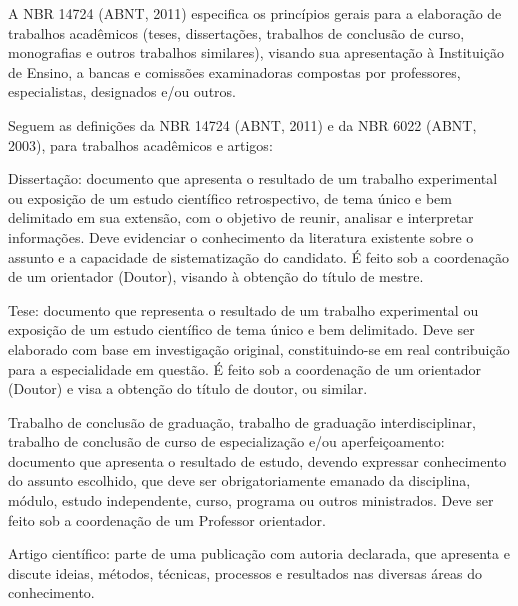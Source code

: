 \begin{Desenvolvimento} %

A NBR 14724 (ABNT, 2011) especifica os princípios gerais para a elaboração de trabalhos acadêmicos (teses, dissertações, trabalhos de conclusão de curso, monografias e outros trabalhos similares), visando sua apresentação à Instituição de Ensino, a bancas e comissões examinadoras compostas por professores, especialistas, designados e/ou outros.

Seguem as definições da NBR 14724 (ABNT, 2011) e da NBR 6022 (ABNT, 2003), para trabalhos acadêmicos e artigos:

\begin{alinea}
    \item Dissertação: documento que apresenta o resultado de um trabalho experimental ou exposição de um estudo científico retrospectivo, de tema único e bem delimitado em sua extensão, com o objetivo de reunir, analisar e interpretar informações. Deve evidenciar o conhecimento da literatura existente sobre o assunto e a capacidade de sistematização do candidato. É feito sob a coordenação de um orientador (Doutor), visando à obtenção do título de mestre.
    \item Tese: documento que representa o resultado de um trabalho experimental ou exposição de um estudo científico de tema único e bem delimitado. Deve ser elaborado com base em investigação original, constituindo-se em real contribuição para a especialidade em questão. É feito sob a coordenação de um orientador (Doutor) e visa a obtenção do título de doutor, ou similar.
    \item Trabalho de conclusão de graduação, trabalho de graduação interdisciplinar, trabalho de conclusão de curso de especialização e/ou aperfeiçoamento: documento que apresenta o resultado de estudo, devendo expressar conhecimento do assunto escolhido, que deve ser obrigatoriamente emanado da disciplina, módulo, estudo independente, curso, programa ou outros ministrados. Deve ser feito sob a coordenação de um Professor orientador.
    \item Artigo científico: parte de uma publicação com autoria declarada, que apresenta e discute ideias, métodos, técnicas, processos e resultados nas diversas áreas do conhecimento.
\end{alinea}


\end{Desenvolvimento}
